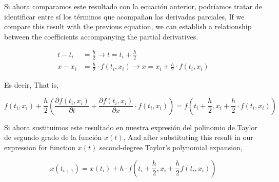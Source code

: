 \begin{paracol}{2}
Si ahora comparamos este resultado con la ecuación anterior, podríamos tratar de identificar entre sí los términos que acompañan las derivadas parciales,
\switchcolumn
If we compare this result with the previous equation, we can establish a relationship between the coefficients accompanying the partial derivatives.
\end{paracol}
\begin{align*}
t-t_i&=\frac{h}{2} \rightarrow t=t_i+\frac{h}{2}\\
x-x_i&=\frac{h}{2}\cdot f(t_i,x_i) \rightarrow x=x_i+\frac{h}{2}\cdot f(t_i,x_i)
\end{align*}
\begin{paracol}{2}
Es decir,
\switchcolumn
That is,
\end{paracol}
\begin{equation*}
f(t_i,x_i)+\frac{h}{2}\left(\frac{\partial f(t_i,x_i)}{\partial t}+\frac{\partial f(t_i,x_i)}{\partial x}\cdot f(t_i,x_i)\right)=f(t_i+\frac{h}{2},x_i+\frac{h}{2}\cdot f(t_i,x_i))
\end{equation*}
\begin{paracol}{2}
Si ahora sustituimos este resultado en nuestra expresión del polinomio de Taylor de segundo grado de la función $x(t)$,
\switchcolumn
And after substituting this result in our expression for function $x(t)$ second-degree Taylor's polynomial expansion, 
\end{paracol}
\begin{equation*}
x(t_{i+1})=x(t_i)+h\cdot f(t_i+\frac{h}{2},x_i+\frac{h}{2}f(t_i,x_i))
\end{equation*}


